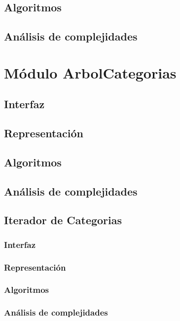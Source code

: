 \documentclass[10pt, a4paper]{article}
\begin{document}
\subsection{Algoritmos}

\subsection{Análisis de complejidades}

\newpage

\section{Módulo ArbolCategorias} 
\subsection{Interfaz}

\subsection{Representaci\'on}

\subsection{Algoritmos}

\subsection{Análisis de complejidades}

\newpage

\subsection{Iterador de Categorias} 
\subsubsection{Interfaz}

\subsubsection{Representaci\'on}

\subsubsection{Algoritmos}

\subsubsection{Análisis de complejidades}

\newpage
\end{document}
